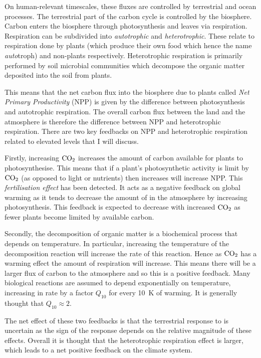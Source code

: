 On human-relevant timescales, these fluxes are controlled by terrestrial and ocean processes. The terrestrial part of the carbon cycle is controlled by the biosphere.
Carbon enters the biosphere through photosynthesis and leaves via respiration. Respiration can be subdivided into \emph{autotrophic} and \emph{heterotrophic}.
These relate to respiration done by plants (which produce their own food which hence the name \emph{auto}troph) and non-plants respectively. Heterotrophic respiration
is primarily performed by soil microbial communities which decompose the organic matter deposited into the soil from plants.

This means that the net carbon flux into the biosphere due to plants called \emph{Net Primary Productivity} (NPP) is given by the difference between photosynthesis and
autotrophic respiration. The overall carbon flux between the land and the atmosphere is therefore the difference between NPP and heterotrophic respiration. There are two key feedbacks
on NPP and heterotrophic respiration related to elevated  levels that I will discuss.

Firstly, increasing $\ce{CO2}$ increases the amount of carbon available for plants to photosynthesise. This means that if a plant's photosynthetic activity is limit by
$\ce{CO2}$ (as opposed to light or nutrients) then increases  will increase NPP\@. This \emph{ fertilisation effect} has been detected. It acts as a negative feedback
on global warming as it tends to decrease the amount of  in the atmosphere by increasing photosynthesis. This feedback is expected to decrease with increased $\ce{CO2}$ as
fewer plants become limited by available carbon.

Secondly, the decomposition of organic matter is a biochemical process that depends on temperature. In particular, increasing the temperature of the decomposition reaction
will increase the rate of this reaction. Hence as $\ce{CO2}$ has a warming effect the amount of respiration will increase. This means there will be a larger flux of carbon to the
atmosphere and so this is a positive feedback. Many biological reactions are assumed to depend exponentially on temperature, increasing in rate by a factor $Q_{10}$ for every
\SI{10}{\kelvin} of warming. It is generally thought that $Q_{10} \approx 2$.

The net effect of these two feedbacks is that the terrestrial response to  is uncertain as the sign of the response depends on the relative magnitude of these effects. Overall it
is thought that the heterotrophic respiration effect is larger, which leads to a net positive feedback on the climate system.

